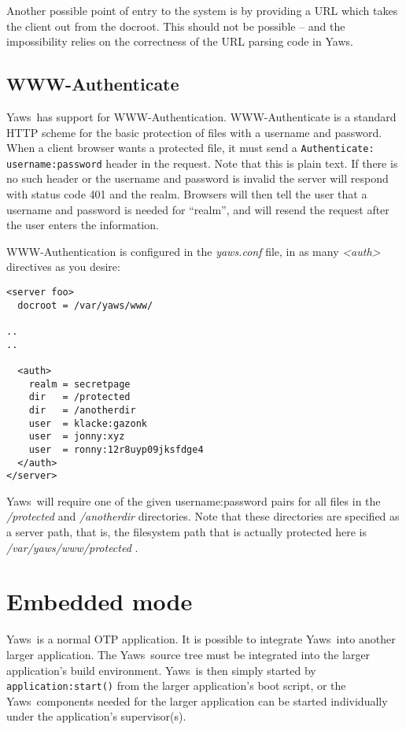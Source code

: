 \documentclass[11pt,oneside,english]{book}
\newcommand{\Yaws}            %
        {{\sc Yaws}}
\begin{document}
Another possible point of entry to the system is by providing a URL
which takes the client out from the docroot. This should not be
possible -- and the impossibility relies on the correctness of the URL
parsing code in \Yaws{}.

\section{WWW-Authenticate}
\Yaws\  has support for WWW-Authentication.   WWW-Authenticate is a
standard HTTP scheme for the basic protection of files with a username
and password.  When a client browser wants a protected file, it must send a
\verb+Authenticate: username:password+ header in the request.  Note that
this is plain text.   If there is no such header or the username and
password is invalid the server will respond with status code 401 and
the realm.  Browsers will then tell the user that a username and
password is needed for ``realm'',  and will resend the request after
the user enters the information.

WWW-Authentication is configured in the \textit{yaws.conf} file, in as
many \textit{<auth>} directives as you desire:

\begin{verbatim}
<server foo>
  docroot = /var/yaws/www/

..
..

  <auth>
    realm = secretpage
    dir   = /protected
    dir   = /anotherdir
    user  = klacke:gazonk
    user  = jonny:xyz
    user  = ronny:12r8uyp09jksfdge4
  </auth>
</server>
\end{verbatim}


\Yaws\  will require one of the given username:password pairs for all
files in the \textit{/protected} and \textit{/anotherdir} directories.
Note that these directories are specified as a server path,  that is,
the filesystem path that is actually protected here is
\textit{/var/yaws/www/protected} .


\chapter {Embedded mode}
\label{embedded}

\Yaws\  is a normal OTP application. It is possible to integrate \Yaws\
into another larger application. The \Yaws\  source tree must be
integrated into the larger application's build environment. \Yaws\  is
then simply started by \verb+application:start()+ from the larger
application's boot script, or the \Yaws\  components needed for the
larger application can be started individually under the application's
supervisor(s).
\end{document}
